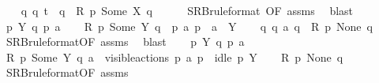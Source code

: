 \begin{isabellebody}
\ \ \isamarkupfalse%
\ {\isacartoucheopen}{\isasymexists}q{\isacharprime}{\kern0pt}{\isachardot}{\kern0pt}\ q\ {\isasymlongmapsto}t\ \ q{\isacharprime}{\kern0pt}\ {\isasymand}\ R\ p{\isacharprime}{\kern0pt}\ {\isacharparenleft}{\kern0pt}Some\ X{\isacharparenright}{\kern0pt}\ q{\isacharprime}{\kern0pt}{\isacartoucheclose}\isanewline
\ \ \ \ \isamarkupfalse%
\ SRB{\isacharunderscore}{\kern0pt}ruleformat{\isacharparenleft}{\kern0pt}{}{\isacharcomma}{\kern0pt}\ {}{\isacharparenright}{\kern0pt}{\isacharbrackleft}{\kern0pt}OF\ assms{\isacharbrackright}{\kern0pt}\ \isamarkupfalse%
\ blast\isanewline
{}\isamarkupfalse%
\isanewline
\ \ \isamarkupfalse%
\ p\ Y\ q\ p{\isacharprime}{\kern0pt}\ a\isanewline
\ \ \isamarkupfalse%
\ {\isacartoucheopen}R\ p\ {\isacharparenleft}{\kern0pt}Some\ Y{\isacharparenright}{\kern0pt}\ q{\isacartoucheclose}\ \ {\isacartoucheopen}p\ {\isasymlongmapsto}a\ p{\isacharprime}{\kern0pt}{\isacartoucheclose}\ \ {\isacartoucheopen}a\ {\isasymin}\ Y{\isacartoucheclose}\isanewline
\ \ \isamarkupfalse%
\ {\isacartoucheopen}{\isasymexists}q{\isacharprime}{\kern0pt}{\isachardot}{\kern0pt}\ q\ {\isasymlongmapsto}a\ q{\isacharprime}{\kern0pt}\ {\isasymand}\ R\ p{\isacharprime}{\kern0pt}\ None\ q{\isacharprime}{\kern0pt}{\isacartoucheclose}\isanewline
\ \ \ \ \isamarkupfalse%
\ SRB{\isacharunderscore}{\kern0pt}ruleformat{\isacharparenleft}{\kern0pt}{}{\isacharparenright}{\kern0pt}{\isacharbrackleft}{\kern0pt}OF\ assms{\isacharbrackright}{\kern0pt}\ \isamarkupfalse%
\ blast\isanewline
{}\isamarkupfalse%
\isanewline
\ \ \isamarkupfalse%
\ p\ Y\ q\ p{\isacharprime}{\kern0pt}\ a\isanewline
\ \ \isamarkupfalse%
\ {\isacartoucheopen}R\ p\ {\isacharparenleft}{\kern0pt}Some\ Y{\isacharparenright}{\kern0pt}\ q{\isacartoucheclose}\ {\isacartoucheopen}a\ {\isasymin}\ visible{\isacharunderscore}{\kern0pt}actions{\isacartoucheclose}\ {\isacartoucheopen}p\ {\isasymlongmapsto}a\ p{\isacharprime}{\kern0pt}{\isacartoucheclose}\ \ {\isacartoucheopen}idle\ p\ Y{\isacartoucheclose}\isanewline
\ \ \isamarkupfalse%
\ {\isacartoucheopen}R\ p\ None\ q{\isacartoucheclose}\ \isamarkupfalse%
\ SRB{\isacharunderscore}{\kern0pt}ruleformat{\isacharparenleft}{\kern0pt}{}{\isacharparenright}{\kern0pt}{\isacharbrackleft}{\kern0pt}OF\ assms{\isacharbrackright}{\kern0pt}\ \isamarkupfalse%

\end{isabellebody}
